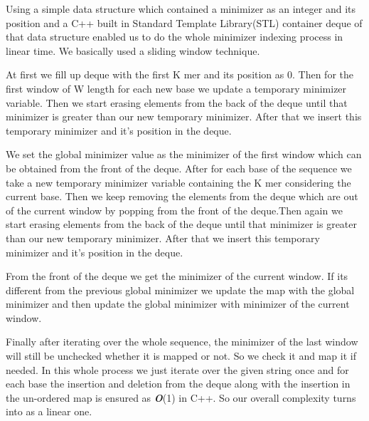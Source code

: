 \documentclass{standalone}
\begin{document}
\begin{breakablealgorithm}
\begin{algorithmic}[1]
			\State{}
			\EndFunction
			
		\end{algorithmic}
	\end{breakablealgorithm}
	
	 
	Using a simple data structure which contained a minimizer as an integer and its position  and a C++ built in Standard Template Library(STL) container deque of that data structure enabled us to do the whole minimizer indexing process in linear time. We basically used a sliding window technique.
	\par 
	At first we fill up deque with the first K mer and its position as 0. Then for the first window of W length for each new base we update a temporary minimizer variable. Then we start erasing elements from the back of the deque until that minimizer is greater than our new temporary minimizer. After that we insert this temporary minimizer and it's position in the deque.
	\par 
	We set the global minimizer value as the minimizer of the first window which can be obtained from the front of the deque. After for each base of the sequence we take a new temporary minimizer variable containing the K mer considering the current base. Then we keep removing the elements from the deque which are out of the current window by popping from the front of the deque.Then again we start erasing elements from the back of the deque until that minimizer is greater than our new temporary minimizer. After that we insert this temporary minimizer and it's position in the deque.
	\par
	From the front of the deque we get the minimizer of the current window. If its different from the previous global minimizer we update the map with the global minimizer and then update the global minimizer with minimizer of the current window.
	\par
	Finally after iterating over the whole sequence, the minimizer of the last window will still be unchecked whether it is mapped or not. So we check it and map it if needed. In this whole  process we just iterate over the given string once and for each base the insertion and deletion from the deque along with the insertion in the un-ordered map is ensured as {\bf \emph{O}}(1) in C++. So our overall complexity turns into as a linear one.
\end{document}
